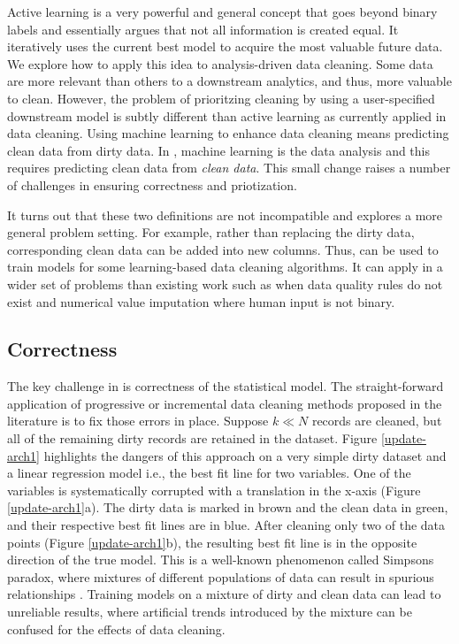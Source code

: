 Active learning is a very powerful and general concept that goes beyond binary labels and essentially argues that not all information is created equal.
It iteratively uses the current best model to acquire the most valuable future data.
We explore how to apply this idea to analysis-driven data cleaning. 
Some data are more relevant than others to a downstream analytics, and thus, more valuable to clean.
However, the problem of prioritzing cleaning by using a user-specified downstream model is subtly different than active learning as currently applied in data cleaning.
Using machine learning to enhance data cleaning means predicting clean data from dirty data.
In \sys, machine learning is the data analysis and this requires predicting clean data from \emph{clean data}.
This small change raises a number of challenges in ensuring correctness and priotization.

It turns out that these two definitions are not incompatible and \sys explores a more general problem setting.
For example, rather than replacing the dirty data, corresponding clean data can be added into new columns. 
Thus, \sys can be used to train models for some learning-based data cleaning algorithms.
It can apply in a wider set of problems than existing work such as when data quality rules do not exist and numerical value imputation where human input is not binary.

\subsection{Correctness}  
The key challenge in \sys is correctness of the statistical model.
The straight-forward application of progressive or incremental data cleaning methods proposed in the literature is to fix those errors in place.
Suppose $k \ll N$ records are cleaned, but all of the remaining dirty records are retained in the dataset.
Figure \ref{update-arch1} highlights the dangers of this approach on a very simple dirty dataset and a linear regression model i.e., the best fit line for two variables. 
One of the variables is systematically corrupted with a translation in the x-axis (Figure \ref{update-arch1}a).
The dirty data is marked in brown and the clean data in green, and their respective best fit lines are in blue.
After cleaning only two of the data points (Figure \ref{update-arch1}b), the resulting best fit line is in the opposite direction of the true model.
This is a well-known phenomenon called Simpsons paradox, where mixtures of different populations of data can result in spurious relationships \cite{simpson1951interpretation}.
Training models on a mixture of dirty and clean data can lead to unreliable results, where artificial trends introduced by the mixture can be confused for the effects of data cleaning.

